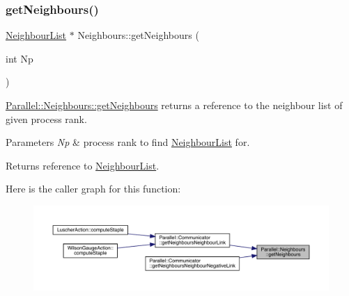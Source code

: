 \mbox{\label{class_parallel_1_1_neighbours_aa3e776b78a708f2c4ce9f287b81f263e}} 
\subsubsection{\texorpdfstring{getNeighbours()}{getNeighbours()}}
{\footnotesize\ttfamily \mbox{\hyperlink{struct_neighbour_list}{Neighbour\+List}} $\ast$ Neighbours\+::get\+Neighbours (\begin{DoxyParamCaption}\item[{int}]{Np }\end{DoxyParamCaption})\hspace{0.3cm}{\ttfamily [static]}}



\mbox{\hyperlink{class_parallel_1_1_neighbours_aa3e776b78a708f2c4ce9f287b81f263e}{Parallel\+::\+Neighbours\+::get\+Neighbours}} returns a reference to the neighbour list of given process rank. 


\begin{DoxyParams}{Parameters}
{\em Np} & process rank to find \mbox{\hyperlink{struct_neighbour_list}{Neighbour\+List}} for. \\
\hline
\end{DoxyParams}
\begin{DoxyReturn}{Returns}
reference to \mbox{\hyperlink{struct_neighbour_list}{Neighbour\+List}}. 
\end{DoxyReturn}
Here is the caller graph for this function\+:
\nopagebreak
\begin{figure}[H]
\begin{center}
\leavevmode
\includegraphics[width=350pt]{class_parallel_1_1_neighbours_aa3e776b78a708f2c4ce9f287b81f263e_icgraph}
\end{center}
\end{figure}
\mbox{\label{class_parallel_1_1_neighbours_ad1a2a616b4089eded3545faf11409b85}} 
